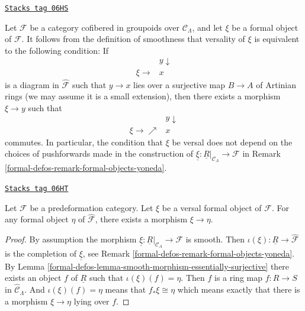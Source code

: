 \begin{remark}
\label{formal-defos-remark-versal-object}
\href{https://stacks.math.columbia.edu/tag/06HS}{\texttt{Stacks tag 06HS}}

Let $\mathcal{F}$ be a category cofibered in groupoids over $\mathcal
C_\Lambda$, and let $\xi$ be a formal object of $\mathcal{F}$.  It follows
from the definition of smoothness that versality of $\xi$ is equivalent to the
following condition: If
$$
\begin{array}{cc} & y \downarrow \\ \xi \longrightarrow & x\end{array}
$$
is a diagram in $\widehat{\mathcal{F}}$ such that $y \to x$ lies over a
surjective map $B \to A$ of Artinian rings (we may assume it is a small
extension),  then there exists a morphism $\xi \to y$ such that
$$
\begin{array}{cc} & y \downarrow \\ \xi \longrightarrow\nearrow & x\end{array}
$$
commutes. In particular, the condition that $\xi$ be versal does not depend on
the choices of pushforwards made in the construction of
$\underline{\xi} : \underline{R}|_{\mathcal{C}_\Lambda} \to \mathcal{F}$ in
Remark \ref{formal-defos-remark-formal-objects-yoneda}.
\end{remark}

\begin{lemma}
\label{formal-defos-lemma-versal-object-quasi-initial}
\href{https://stacks.math.columbia.edu/tag/06HT}{\texttt{Stacks tag 06HT}}

Let $\mathcal{F}$ be a predeformation category.
Let $\xi$ be a versal formal object of $\mathcal{F}$.
For any formal object $\eta$ of $\widehat{\mathcal{F}}$,
there exists a morphism $\xi \to \eta$.
\end{lemma}

\begin{proof}
By assumption the morphism
$\underline{\xi} : \underline{R}|_{\mathcal{C}_\Lambda} \to \mathcal{F}$
is smooth. Then
$\iota(\xi) : \underline{R} \to \widehat{\mathcal{F}}$
is the completion of $\underline{\xi}$, see
Remark \ref{formal-defos-remark-formal-objects-yoneda}.
By
Lemma \ref{formal-defos-lemma-smooth-morphism-essentially-surjective}
there exists an object $f$ of $\underline{R}$ such that
$\iota(\xi)(f) = \eta$. Then $f$ is
a ring map $f : R \to S$ in $\widehat{\mathcal{C}}_\Lambda$. And
$\iota(\xi)(f) = \eta$ means that
$f_*\xi \cong \eta$ which means exactly that there is a morphism
$\xi \to \eta$ lying over $f$.
\end{proof}

